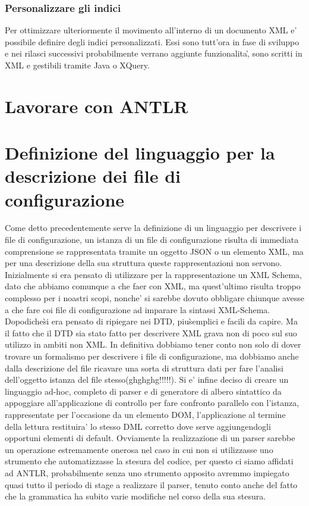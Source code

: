 \documentclass[11pt,titlepage,a4paper,twoside,openany]{book}
\begin{document}
\subsection{Personalizzare gli indici}
Per ottimizzare ulteriormente il movimento all'interno di un documento XML e' possibile definire degli indici personalizzati. Essi sono tutt'ora in fase di sviluppo e nei rilasci successivi probabilmente verrano aggiunte funzionalita\`, sono scritti in XML e gestibili tramite Java o XQuery.

\chapter{Lavorare con ANTLR}

\chapter{Definizione del linguaggio per la descrizione dei file di configurazione}
Come detto precedentemente serve la definizione di un linguaggio per descrivere i file di configurazione, un istanza di un file di configurazione risulta di immediata comprensione se rappresentata tramite un oggetto JSON o un elemento XML, ma per una descrizione della sua struttura queste rappresentazioni non servono.
Inizialmente si era pensato di utilizzare per la rappresentazione un XML Schema, dato che abbiamo comunque a che faer con XML, ma quest'ultimo risulta troppo complesso per i noastri scopi, nonche' si sarebbe dovuto obbligare chiunque avesse a che fare coi file di configurazione ad imparare la sintassi XML-Schema.
Dopodiche\` si era pensato di ripiegare nei DTD, piu\` semplici e facili da capire. Ma il fatto che il DTD sia stato fatto per descrivere XML grava non di poco sul suo utilizzo in ambiti non XML.
In definitiva dobbiamo tener conto non solo di dover trovare un formalismo per descrivere i file di configurazione, ma dobbiamo anche dalla descrizione del file ricavare una sorta di struttura dati per fare l'analisi dell'oggetto istanza del file stesso(ghghghg!!!!!).
Si e' infine deciso di creare un linguaggio ad-hoc, completo di parser e di generatore di albero sintattico da appoggiare all'applicazione di controllo per fare confronto parallelo con l'istanza, rappresentate per l'occasione da un elemento DOM, l'applicazione al termine della lettura restituira' lo stesso DML corretto dove serve aggiungendogli opportuni elementi di default.
Ovviamente la realizzazione di un parser sarebbe un operazione estremamente onerosa nel caso in cui non si utilizzasse uno strumento che automatizzasse la stesura del codice, per questo ci siamo affidati ad ANTLR, probabilmente senza uno strumento apposito avremmo impiegato quasi tutto il periodo di stage a realizzare il parser, tenuto conto anche del fatto che la grammatica ha subito varie modifiche nel corso della sua stesura.
\end{document}
